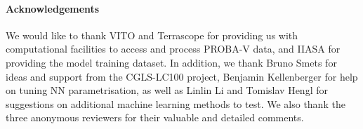 \documentclass[review,authoryear,3p]{elsarticle}
\newcommand{\minisection}[1]{\paragraph{#1}}%
\begin{document}

\minisection{Acknowledgements} We would like to thank VITO and Terrascope for providing us with computational facilities to access and process {PROBA-V} data, and IIASA for providing the model training dataset. In addition, we thank Bruno Smets for ideas and support from the \gls{CGLS-LC100} project, Benjamin Kellenberger for help on tuning \gls{NN} parametrisation, as well as Linlin Li and Tomislav Hengl for suggestions on additional machine learning methods to test. We also thank the three anonymous reviewers for their valuable and detailed comments.






\end{document}
